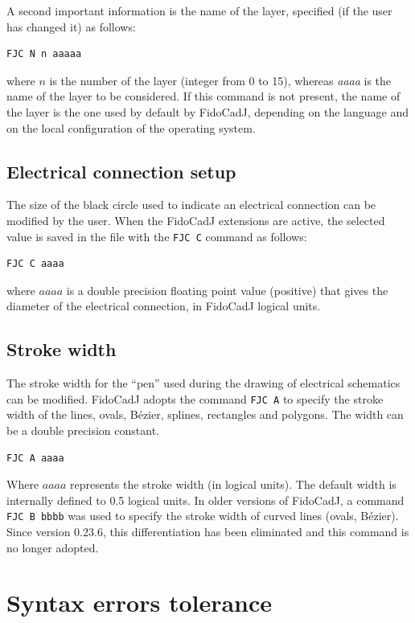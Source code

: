 \documentclass[10pt,a4paper,twoside]{scrreprt}
\begin{document}
A second important information is the name of the layer, specified (if the user has changed it) as follows:
\begin{lstlisting}
FJC N n aaaaa
\end{lstlisting}
where $n$ is the number of the layer (integer from 0 to 15), whereas {\normalfont \itshape aaaa} is the name of the layer to be considered. If this command is not present, the name of the layer is the one used by default by FidoCadJ, depending on the language and on the local configuration of the operating system.

\subsection{Electrical connection setup}
The size of the black circle used to indicate an electrical connection can be modified by the user.
When the FidoCadJ extensions are active, the selected value is saved in the file with the \lstinline!FJC C! command as follows:
\begin{lstlisting}
FJC C aaaa
\end{lstlisting}
where $aaaa$ is a double precision floating point value (positive) that gives the diameter of the electrical connection, in FidoCadJ logical units.

 \subsection{Stroke width}
 The stroke width for the ``pen'' used during the drawing of electrical schematics can be modified. FidoCadJ adopts the command \lstinline!FJC A! to specify the stroke width of the lines, ovals, B\'ezier, splines, rectangles and polygons. The width can be a double precision constant.
\begin{lstlisting}
FJC A aaaa
\end{lstlisting}
Where $aaaa$ represents the stroke width (in logical units). The default width is internally defined to 0.5 logical units. In older versions of FidoCadJ, a command \lstinline!FJC B bbbb! was used to specify the stroke width of curved lines (ovals, B\'ezier). Since version 0.23.6, this differentiation has been eliminated and this command is no longer adopted.

\section{Syntax errors tolerance}
\end{document}

